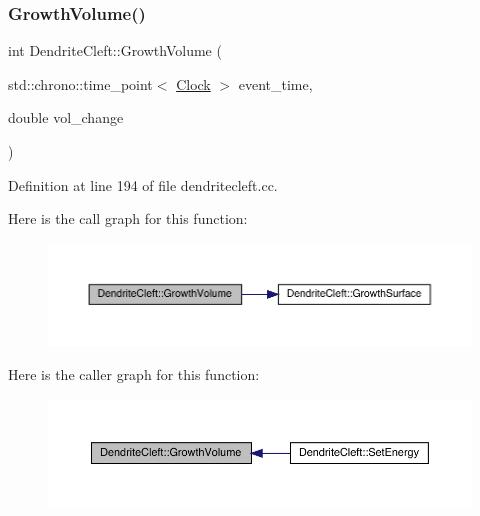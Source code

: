 \subsubsection{\texorpdfstring{Growth\+Volume()}{GrowthVolume()}}
{\footnotesize\ttfamily int Dendrite\+Cleft\+::\+Growth\+Volume (\begin{DoxyParamCaption}\item[{std\+::chrono\+::time\+\_\+point$<$ \hyperlink{universe_8h_a0ef8d951d1ca5ab3cfaf7ab4c7a6fd80}{Clock} $>$}]{event\+\_\+time,  }\item[{double}]{vol\+\_\+change }\end{DoxyParamCaption})}



Definition at line 194 of file dendritecleft.\+cc.

Here is the call graph for this function\+:
\nopagebreak
\begin{figure}[H]
\begin{center}
\leavevmode
\includegraphics[width=350pt]{class_dendrite_cleft_a0cb2fc6ad72bba55b5f65130006d4b12_cgraph}
\end{center}
\end{figure}
Here is the caller graph for this function\+:
\nopagebreak
\begin{figure}[H]
\begin{center}
\leavevmode
\includegraphics[width=350pt]{class_dendrite_cleft_a0cb2fc6ad72bba55b5f65130006d4b12_icgraph}
\end{center}
\end{figure}
\mbox{\label{class_dendrite_cleft_afaf06d4516355dfe2e0e4c33a00f0f1d}} 
